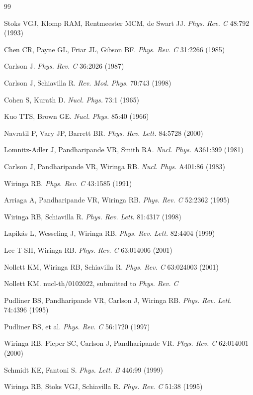 \begin{thebibliography}{99}

Stoks VGJ, Klomp RAM, Rentmeester MCM, de Swart JJ.
{\it Phys. Rev. C} 48:792 (1993)

Chen CR, Payne GL, Friar JL, Gibson BF.
{\it Phys. Rev. C} 31:2266 (1985)

Carlson J.
{\it Phys. Rev. C} 36:2026 (1987)

Carlson J, Schiavilla R.
{\it Rev. Mod. Phys.} 70:743 (1998)

Cohen S, Kurath D.
{\it Nucl. Phys.} 73:1 (1965)

Kuo TTS, Brown GE.
{\it Nucl. Phys.} 85:40 (1966)

Navratil P, Vary JP, Barrett BR.
{\it Phys. Rev. Lett.} 84:5728 (2000)

Lomnitz-Adler J, Pandharipande VR, Smith RA.
{\it Nucl. Phys.} A361:399 (1981)

Carlson J, Pandharipande VR, Wiringa RB.
{\it Nucl. Phys.} A401:86 (1983)

Wiringa RB.
{\it Phys. Rev. C} 43:1585 (1991)

Arriaga A, Pandharipande VR, Wiringa RB.
{\it Phys. Rev. C} 52:2362 (1995)

Wiringa RB, Schiavilla R.
{\it Phys. Rev. Lett.} 81:4317 (1998)

Lapik\'as L, Wesseling J, Wiringa RB.
{\it Phys. Rev. Lett.} 82:4404 (1999)

Lee T-SH, Wiringa RB.
{\it Phys. Rev. C} 63:014006 (2001)

Nollett KM, Wiringa RB, Schiavilla R.
{\it Phys. Rev. C} 63:024003 (2001)

Nollett KM.
nucl-th/0102022, submitted to {\it Phys. Rev. C}

Pudliner BS, Pandharipande VR, Carlson J, Wiringa RB.
{\it Phys. Rev. Lett.} 74:4396 (1995)

Pudliner BS, et al.
{\it Phys. Rev. C} 56:1720 (1997)

Wiringa RB, Pieper SC, Carlson J, Pandharipande VR.
{\it Phys. Rev. C} 62:014001 (2000)

Schmidt KE, Fantoni S.
{\it Phys. Lett. B} 446:99 (1999)

Wiringa RB, Stoks VGJ, Schiavilla R.
{\it Phys. Rev. C} 51:38 (1995)


\end{thebibliography}
